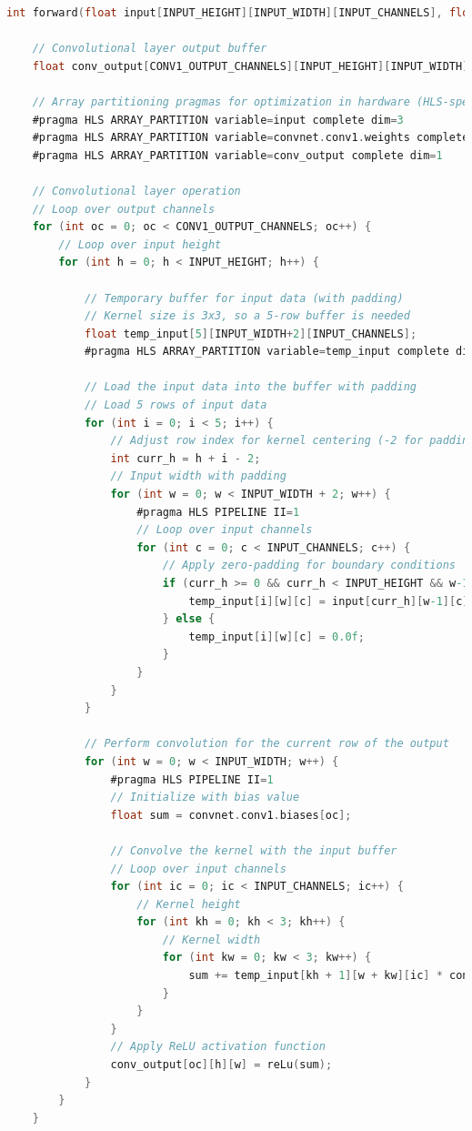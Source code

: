 \documentclass{article}
\begin{document}
\begin{lstlisting}[language=C]
int forward(float input[INPUT_HEIGHT][INPUT_WIDTH][INPUT_CHANNELS], float output[NUM_CLASSES]) {
    
    // Convolutional layer output buffer
    float conv_output[CONV1_OUTPUT_CHANNELS][INPUT_HEIGHT][INPUT_WIDTH];
    
    // Array partitioning pragmas for optimization in hardware (HLS-specific)
    #pragma HLS ARRAY_PARTITION variable=input complete dim=3
    #pragma HLS ARRAY_PARTITION variable=convnet.conv1.weights complete dim=1
    #pragma HLS ARRAY_PARTITION variable=conv_output complete dim=1

    // Convolutional layer operation
    // Loop over output channels
    for (int oc = 0; oc < CONV1_OUTPUT_CHANNELS; oc++) {
        // Loop over input height
        for (int h = 0; h < INPUT_HEIGHT; h++) {        

            // Temporary buffer for input data (with padding)
            // Kernel size is 3x3, so a 5-row buffer is needed
            float temp_input[5][INPUT_WIDTH+2][INPUT_CHANNELS]; 
            #pragma HLS ARRAY_PARTITION variable=temp_input complete dim=3
            
            // Load the input data into the buffer with padding
            // Load 5 rows of input data
            for (int i = 0; i < 5; i++) { 
                // Adjust row index for kernel centering (-2 for padding)
                int curr_h = h + i - 2;  
                // Input width with padding
                for (int w = 0; w < INPUT_WIDTH + 2; w++) { 
                    #pragma HLS PIPELINE II=1
                    // Loop over input channels
                    for (int c = 0; c < INPUT_CHANNELS; c++) {
                        // Apply zero-padding for boundary conditions
                        if (curr_h >= 0 && curr_h < INPUT_HEIGHT && w-1 >= 0 && w-1 < INPUT_WIDTH) {
                            temp_input[i][w][c] = input[curr_h][w-1][c];
                        } else {
                            temp_input[i][w][c] = 0.0f;
                        }
                    }
                }
            }
            
            // Perform convolution for the current row of the output
            for (int w = 0; w < INPUT_WIDTH; w++) {
                #pragma HLS PIPELINE II=1
                // Initialize with bias value
                float sum = convnet.conv1.biases[oc]; 
                
                // Convolve the kernel with the input buffer
                // Loop over input channels
                for (int ic = 0; ic < INPUT_CHANNELS; ic++) { 
                    // Kernel height
                    for (int kh = 0; kh < 3; kh++) {      
                        // Kernel width    
                        for (int kw = 0; kw < 3; kw++) {      
                            sum += temp_input[kh + 1][w + kw][ic] * convnet.conv1.weights[oc][ic][kh][kw];
                        }
                    }
                }
                // Apply ReLU activation function
                conv_output[oc][h][w] = reLu(sum); 
            }
        }
    }


\end{lstlisting}
\end{document}
